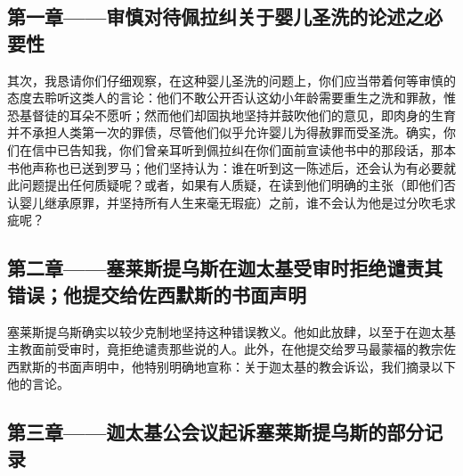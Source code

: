 
\subsection{第一章——审慎对待佩拉纠关于婴儿圣洗的论述之必要性}

其次，我恳请你们仔细观察，在这种婴儿圣洗的问题上，你们应当带着何等审慎的态度去聆听这类人的言论：他们不敢公开否认这幼小年龄需要重生之洗和罪赦，惟恐基督徒的耳朵不愿听；然而他们却固执地坚持并鼓吹他们的意见，即肉身的生育并不承担人类第一次的罪债，尽管他们似乎允许婴儿为得赦罪而受圣洗。确实，你们在信中已告知我，你们曾亲耳听到佩拉纠在你们面前宣读他书中的那段话，那本书他声称也已送到罗马；他们坚持认为：谁在听到这一陈述后，还会认为有必要就此问题提出任何质疑呢？或者，如果有人质疑，在读到他们明确的主张（即他们否认婴儿继承原罪，并坚持所有人生来毫无瑕疵）之前，谁不会认为他是过分吹毛求疵呢？\par


\subsection{第二章——塞莱斯提乌斯在迦太基受审时拒绝谴责其错误；他提交给佐西默斯的书面声明}

塞莱斯提乌斯确实以较少克制地坚持这种错误教义。他如此放肆，以至于在迦太基主教面前受审时，竟拒绝谴责那些说的人。此外，在他提交给罗马最蒙福的教宗佐西默斯的书面声明中，他特别明确地宣称：关于迦太基的教会诉讼，我们摘录以下他的言论。\par


\subsection{第三章——迦太基公会议起诉塞莱斯提乌斯的部分记录}

